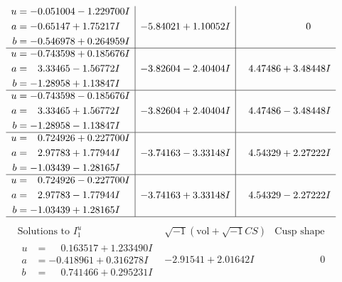 \documentclass[1p]{elsarticle_modified}
\theoremstyle{definition}
\newcommand{\I}{\sqrt{-1}}
\begin{document}
$$\begin{array}{c|c|c}
\begin{aligned}
u &= -0.051004 - 1.229700 I \\
a &= -0.65147 + 1.75217 I \\
b &= -0.546978 + 0.264959 I\end{aligned}
 & -5.84021 + 1.10052 I & \phantom{-0.000000 } 0 \\ \hline\begin{aligned}
u &= -0.743598 + 0.185676 I \\
a &= \phantom{-}3.33465 - 1.56772 I \\
b &= -1.28958 + 1.13847 I\end{aligned}
 & -3.82604 - 2.40404 I & \phantom{-}4.47486 + 3.48448 I \\ \hline\begin{aligned}
u &= -0.743598 - 0.185676 I \\
a &= \phantom{-}3.33465 + 1.56772 I \\
b &= -1.28958 - 1.13847 I\end{aligned}
 & -3.82604 + 2.40404 I & \phantom{-}4.47486 - 3.48448 I \\ \hline\begin{aligned}
u &= \phantom{-}0.724926 + 0.227700 I \\
a &= \phantom{-}2.97783 + 1.77944 I \\
b &= -1.03439 - 1.28165 I\end{aligned}
 & -3.74163 - 3.33148 I & \phantom{-}4.54329 + 2.27222 I \\ \hline\begin{aligned}
u &= \phantom{-}0.724926 - 0.227700 I \\
a &= \phantom{-}2.97783 - 1.77944 I \\
b &= -1.03439 + 1.28165 I\end{aligned}
 & -3.74163 + 3.33148 I & \phantom{-}4.54329 - 2.27222 I\\
 \hline 
 \end{array}$$\newpage$$\begin{array}{c|c|c}  
\text{Solutions to }I^u_{1}& \I (\text{vol} + \sqrt{-1}CS) & \text{Cusp shape}\\
 \hline 
\begin{aligned}
u &= \phantom{-}0.163517 + 1.233490 I \\
a &= -0.418961 + 0.316278 I \\
b &= \phantom{-}0.741466 + 0.295231 I\end{aligned}
 & -2.91541 + 2.01642 I & \phantom{-0.000000 } 0 \\ \hline\begin{aligned}

\end{aligned}
\end{array}$$
\end{document}
